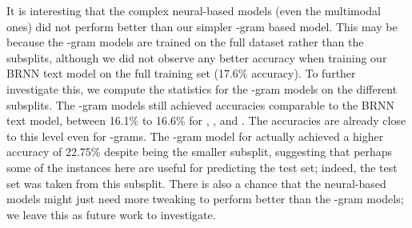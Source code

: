 \documentclass[twocolumn]{svjour3}          \smartqed  \usepackage{graphicx}
\begin{document}
\begin{comment}
\begin{table}[t]
    \caption{Word similarity scores for the fill-in-the-blank task, comparing the scores of text-only, image-only, and multimodal models. We present the results across models trains on different subsets of the data, and also present results on the full test set (\textbf{test-full}) and also on a subset where predicted words are seen during training (\textbf{test-seen}).}
    \label{tbl:gapfilling-similarity}
    \centering
\begin{tabular}{l c c c c}
    \toprule
    & & \textbf{text} & \textbf{image} & \textbf{multimodal} \\
        \midrule
         \multirow{5}{*}{\begin{sideways}test-full\end{sideways}} &  & & & \\
         &  & & & \\
         &  & & & \\
         &  & & & \\
         & full & & & \\
        \midrule
          \multirow{5}{*}{\begin{sideways}test-seen\end{sideways}} 
 &  (all) & 0.34 & 0.28 & 0.33\\
 &  (all) & 0.36 & 0.29 & 0.34\\
 &  (all) & 0.34 & 0.30 & 0.36\\          
 &  (sub) & 0.18 & 0.28 & 0.32\\
 &  (sub) & 0.17 & 0.29 & 0.35\\
 &  (sub) & 0.11 & 0.31 & 0.37\\
 &  (sub) & 0.17 & 0.31 & 0.43\\
         & full & & & \\     
    \bottomrule
    \end{tabular}
\end{table}
\end{comment}

It is interesting that the complex neural-based models (even the multimodal ones) did not perform better than our simpler -gram based model. This may be because the -gram models are trained on the full dataset rather than the subsplits, although we did not observe any better accuracy when training our BRNN text model on the full training set (17.6\% accuracy). To further investigate this, we compute the statistics for the -gram models on the different  subsplits. The -gram models still achieved accuracies comparable to the BRNN text model, between 16.1\% to 16.6\% for , , and . The accuracies are already close to this level even for -grams. The -gram model for  actually achieved a higher accuracy of 22.75\% despite being the smaller subsplit, suggesting that perhaps some of the instances here are useful for predicting the test set; indeed, the test set was taken from this subsplit. There is also a chance that the neural-based models might just need more tweaking to perform better than the -gram models; we leave this as future work to investigate.
\end{document}
